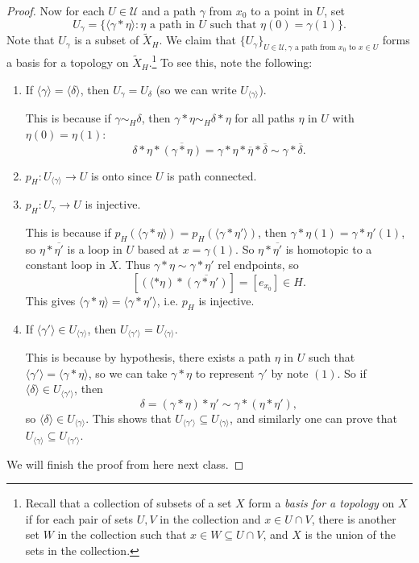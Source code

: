 \begin{proof}
  Now for each $U \in \mathcal{U}$ and a path
  $\gamma$ from $x_0 $ to a point in $U$, set
  \[
    U_{\gamma} = \{\langle \gamma * \eta \rangle : \eta \text{ a path in $U$ such that $\eta(0) = \gamma(1)$}\}.
  \]
  Note that $U_\gamma$ is a subset of $\widetilde{X}_H$.
  We claim that $\{U_\gamma\}_{U \in \mathcal{U}, \gamma \text{ a path from $x_0$ to $x \in U$}}$ forms a basis
  for a topology on $\widetilde{X}_H$.\footnote{Recall that a collection of subsets of a set $X$ form a \emph{basis for a topology} on $X$ if for each pair of sets $U, V$ in the collection and $x \in U \cap V$, there is another set $W$ in the collection such that $x \in W \subseteq U \cap V$, and $X$ is the union of the sets in the collection.} To see this, note the following:
  \begin{enumerate}
    \item If $\langle \gamma \rangle = \langle \delta \rangle$, then $U_\gamma = U_\delta$ (so we can write $U_{\langle \gamma \rangle}$).

      This is because if $\gamma \sim_H \delta$, then
      $\gamma * \eta \sim_H \delta * \eta$
      for all paths $\eta$ in $U$ with $\eta(0) = \eta(1)$:
      \[
        \delta * \eta * \overline{(\gamma * \eta)}
        = \gamma * \eta * \overline{\eta} * \overline{\delta}
        \sim \gamma * \overline{\delta}.
      \]
    \item $p_H : U_{\langle \gamma \rangle} \to U$ is
      onto since $U$ is path connected.
    \item $p_H : U_{\gamma} \to U$ is injective.

      This is because if $p_H(\langle \gamma * \eta \rangle) = p_H(\langle \gamma * \eta' \rangle)$,
      then $\gamma * \eta(1) = \gamma * \eta'(1)$, so
      $\eta * \overline{\eta'}$ is a loop in $U$ based
      at $x = \gamma(1)$. So $\eta * \overline{\eta'}$ is
      homotopic to a constant loop in $X$. Thus
      $\gamma * \eta \sim \gamma * \eta'$ rel endpoints, so
      \[
        [(\langle * \eta) * \overline{(\gamma * \eta')}]
        = [e_{x_0}] \in H.
      \]
      This gives $\langle \gamma * \eta \rangle = \langle \gamma * \eta' \rangle$, i.e. $p_H$ is injective.
    \item If $\langle \gamma' \rangle \in U_{\langle \gamma \rangle}$, then
      $U_{\langle \gamma' \rangle} = U_{\langle \gamma \rangle}$.

      This is because by hypothesis, there exists
      a path $\eta$ in $U$ such that
      $\langle \gamma' \rangle = \langle \gamma * \eta \rangle$,
      so we can take $\gamma * \eta$ to represent
      $\gamma'$ by note $(1)$. So if
      $\langle \delta \rangle \in U_{\langle \gamma' \rangle}$, then
      \[
        \delta = (\gamma * \eta) * \eta'
       \sim \gamma * (\eta * \eta'),
      \]
      so $\langle \delta \rangle \in U_{\langle \gamma \rangle}$.
      This shows that $U_{\langle \gamma' \rangle} \subseteq U_{\langle \gamma \rangle}$, and
      similarly one can prove that $U_{\langle \gamma \rangle} \subseteq U_{\langle \gamma' \rangle}$.
  \end{enumerate}
  We will finish the proof from here next class.
\end{proof}

